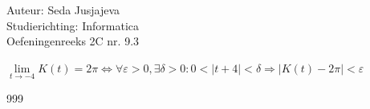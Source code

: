 \documentclass[a4paper]{article}
\begin{document}
\noindent \large Auteur: Seda Jusjajeva\\
\noindent \large Studierichting: Informatica\\
\noindent \large Oefeningenreeks 2C nr. 9.3 \\

\medskip

\normalsize

$\lim\limits_{t\rightarrow-4}K(t) = 2\pi \Leftrightarrow \forall\varepsilon > 0, \exists\delta>0 : 0<|t+4|<\delta \Rightarrow |K(t)-2\pi|<\varepsilon$ \\


\begin{thebibliography}{999}
\end{thebibliography}
\end{document}
